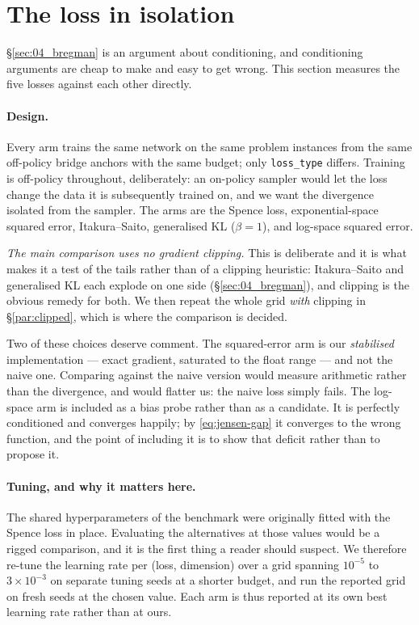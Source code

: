 \section{The loss in isolation}
\label{sec:05_offpolicy_exp}

\S\ref{sec:04_bregman} is an argument about conditioning, and conditioning
arguments are cheap to make and easy to get wrong. This section measures the
five losses against each other directly.

\paragraph{Design.}
Every arm trains the same network on the same problem instances from the same
off-policy bridge anchors with the same budget; only \texttt{loss\_type}
differs. Training is off-policy throughout, deliberately: an on-policy sampler
would let the loss change the data it is subsequently trained on, and we want
the divergence isolated from the sampler. The arms are the Spence loss,
exponential-space squared error, Itakura--Saito, generalised KL
($\beta=1$), and log-space squared error.

\emph{The main comparison uses no gradient clipping.} This is deliberate and
it is what makes it a test of the tails rather than of a clipping heuristic:
Itakura--Saito and generalised KL each explode on one side
(\S\ref{sec:04_bregman}), and clipping is the obvious remedy for both. We then
repeat the whole grid \emph{with} clipping in \S\ref{par:clipped}, which is
where the comparison is decided.

Two of these choices deserve comment. The squared-error arm is our
\emph{stabilised} implementation --- exact gradient, saturated to the float
range --- and not the naive one. Comparing against the naive version would
measure arithmetic rather than the divergence, and would flatter us: the naive
loss simply fails. The log-space arm is included as a bias probe rather than as
a candidate. It is perfectly conditioned and converges happily; by
\eqref{eq:jensen-gap} it converges to the wrong function, and the point of
including it is to show that deficit rather than to propose it.

\paragraph{Tuning, and why it matters here.}
The shared hyperparameters of the benchmark were originally fitted with the
Spence loss in place. Evaluating the alternatives at those values would be a
rigged comparison, and it is the first thing a reader should suspect. We
therefore re-tune the learning rate per (loss, dimension) over a grid spanning
$10^{-5}$ to $3\times10^{-3}$ on separate tuning seeds at a shorter budget, and
run the reported grid on fresh seeds at the chosen value. Each arm is thus
reported at its own best learning rate rather than at ours.

